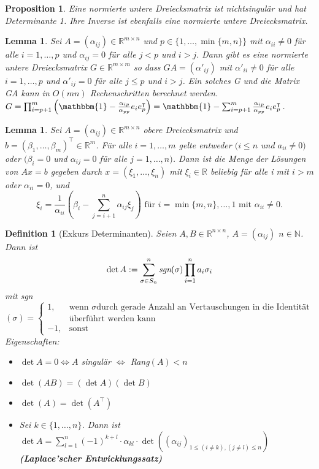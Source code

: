\documentclass[12pt,a4paper]{article}
\theoremstyle{plain}
\newtheorem{Prop}[Theorem]{Proposition}
\newtheorem{Lemma}[Theorem]{Lemma}
\newtheorem{Definition}[Theorem]{Definition}
\newcommand{\herv}[1]{{\emph{\textbf{#1}}}}
\newcommand{\N}{\mathbb{N}}
\newcommand{\R}{\mathbb{R}}
\numberwithin{equation}{section}
\begin{document}
\begin{Prop}
Eine normierte untere Dreiecksmatrix ist nichtsingulär und hat Determinante 1. Ihre Inverse ist ebenfalls eine normierte untere Dreiecksmatrix.
\end{Prop}
\begin{Lemma}
Sei $A=(\alpha_{ij})\in \R^{m\times n}$ und $p\in \{1,\ldots,\min\{m,n\}\}$ mit $\alpha_{ii}\neq 0$ für alle $i=1,\ldots,p$ und $\alpha_{ij}=0$ für alle $j<p$ und $i>j$. Dann gibt es eine normierte untere Dreiecksmatrix $G\in \R^{m\times m}$ so dass $GA=(\alpha'_{ij})$ mit $\alpha'_{ii}\neq 0$ für alle $i=1,\ldots,p$ und $\alpha'_{ij}=0$ für alle $j\leq p$ und $i>j$. Ein solches G und die Matrix GA kann in $O(mn)$ Rechenschritten berechnet werden. \\
$G=\prod_{i=p+1}^m{\left(\mathbbm{1}-\frac{\alpha_{ip}}{\alpha_{pp}}e_i e_p^\intercal\right)} =\mathbbm{1}-\sum_{i=p+1}^m{\frac{\alpha_{ip}}{\alpha_{pp}}e_i e_p^\intercal}$.
\end{Lemma}
\begin{Lemma}
Sei $A=(\alpha_{ij})\in \R^{m\times n}$ obere Dreiecksmatrix und $b=(\beta_1,\ldots,\beta_m)^\intercal \in \R^m$. Für alle $i=1,\ldots,m$ gelte entweder $(i\leq n$ und $a_{ii}\neq 0)$ oder $(\beta_i=0$ und $\alpha_{ij}=0$ für alle $j=1,\ldots,n)$. Dann ist die Menge der Lösungen von $Ax=b$ gegeben durch $x=(\xi_1,\ldots,\xi_n)$ mit $\xi_i\in \R$ beliebig für alle i mit $i>m$ oder $\alpha_{ii}=0$, und 
\[ \xi_i=\frac{1}{\alpha_{ii}}\left(\beta_i-\sum_{j=i+1}^n{\alpha_{ij}\xi_j}\right) \text{ für }i=\min\{m,n\},\ldots,1\text{ mit }\alpha_{ii}\neq 0 .\]
\end{Lemma}
\begin{Definition}[Exkurs Determinanten]
Seien $A,B\in \R^{n\times n}$, $A=(\alpha_{ij})$ $n\in \N$. Dann ist \[
\det A:=\sum_{\sigma \in S_n}^n{\emph{sgn}(\sigma)\prod_{i=1}^n{a_i\sigma_i}}\] mit \emph{sgn}$(\sigma)=\left\lbrace\begin{array}{ll} 1,&\text{wenn }\sigma\text{durch gerade Anzahl an Vertauschungen in die Identität}\\&\text{überführt werden kann} \\ -1,&\text{sonst} \end{array} \right.$\\
Eigenschaften: \begin{itemize}
\item $\det A=0 \Leftrightarrow A$ singulär $\Leftrightarrow$ \emph{Rang}$(A)<n$
\item $\det(AB)=(\det A)(\det B)$
\item $\det(A)=\det(A^\intercal)$
\item Sei $k\in \{1,\ldots,n\}$. Dann ist $\det A=\sum_{l=1}^n{(-1)^{k+l}\cdot \alpha_{kl}\cdot \det\left( (\alpha_{ij})_{1\leq (i\neq k),(j\neq l)\leq n}\right)}$\\ \herv{(Laplace'scher Entwicklungssatz)}
\end{itemize}
\end{Definition}
\end{document}
